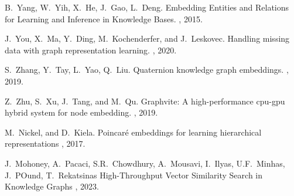 \documentclass[11pt]{article}
\begin{document}
\begin{thebibliography}{10}
\begin{small}
 B.~Yang, W.~Yih, X.~He, J.~Gao, L.~Deng. \newblock Embedding Entities and Relations for Learning and Inference in Knowledge Bases. , 2015.

 J.~You, X.~Ma, Y.~Ding, M.~Kochenderfer, and J.~Leskovec. \newblock Handling missing data with graph representation learning. , 2020.

 S.~Zhang, Y.~Tay, L.~Yao, Q.~Liu. \newblock Quaternion knowledge graph embeddings. , 2019.

 Z.~Zhu, S.~Xu, J.~Tang, and M.~Qu. \newblock Graphvite: A high-performance cpu-gpu hybrid system for node embedding. , 2019.

 M.~Nickel, and D.~Kiela. \newblock Poincaré embeddings for learning hierarchical representations , 2017.

 J.~Mohoney, A.~Pacaci, S.R.~Chowdhury, A.~Mousavi, I.~Ilyas, U.F.~Minhas, J.~POund, T.~Rekatsinas \newblock High-Throughput Vector Similarity Search in Knowledge Graphs , 2023.

\end{small}
\end{thebibliography}
\end{document}
